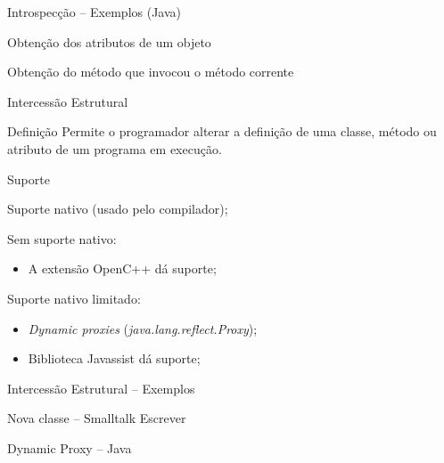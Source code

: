 \documentclass[12pt,t]{beamer}
\begin{document}
 	 \begin{frame}{Introspecção -- Exemplos (Java)}
 	 	\begin{exampleblock}{Obtenção dos atributos de um objeto}
 	 		
 	 	\end{exampleblock}
 	 	\pause
 	 	\begin{exampleblock}{Obtenção do método que invocou o método corrente}
 	 		
 	 	\end{exampleblock}
 	 \end{frame}
 	 \begin{frame}{Intercessão Estrutural}
 	 	\begin{block}{Definição \cite{chiba2000load}}
 	 		Permite o programador alterar a definição de uma classe, método ou atributo de um programa em execução.
 	 	\end{block} 
 	 	\pause
 	 	\begin{block}{Suporte}
 	 		\begin{description}[Smalltalk:]
 	 			\item [Smalltalk:] Suporte nativo (usado pelo compilador);
 	 			\pause
 	 			\item [C++:] Sem suporte nativo:  
 	 				\begin{itemize}
		 	 			\item A extensão OpenC++ \cite{chiba1995metaobject} dá suporte;
		 	 		\end{itemize}
	 	 		\pause
 	 			\item [Java:] Suporte nativo limitado:
	 	 			\begin{itemize}
	 	 				\item \emph{Dynamic proxies} (\emph{java.lang.reflect.Proxy});
	 	 				\item Biblioteca Javassist \cite{chiba2000load} dá suporte;
	 	 			\end{itemize}
 	 		\end{description}
 	 	\end{block}
 	 \end{frame}
 	 \begin{frame}{Intercessão Estrutural -- Exemplos}
 	 	\begin{exampleblock}{Nova classe -- Smalltalk}
 	 		\alert{Escrever}
 	 	\end{exampleblock}
 	 	\pause
 	 	\begin{exampleblock}{Dynamic Proxy -- Java}
 	 		
 	 	\end{exampleblock}
 	 \end{frame}
\end{document}
